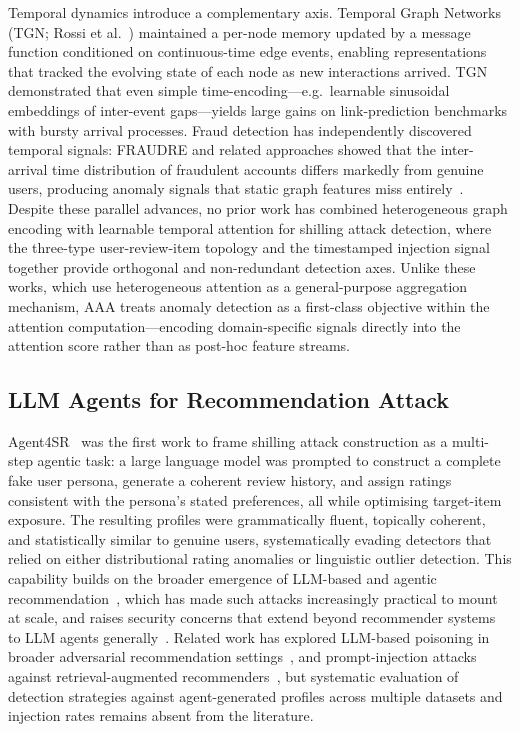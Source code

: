 Temporal dynamics introduce a complementary axis.
Temporal Graph Networks (TGN; Rossi et al.~\cite{rossi2020temporal}) maintained
a per-node memory updated by a message function conditioned on
continuous-time edge events, enabling representations that tracked the
evolving state of each node as new interactions arrived.
TGN demonstrated that even simple time-encoding—e.g.\ learnable sinusoidal
embeddings of inter-event gaps—yields large gains on link-prediction benchmarks
with bursty arrival processes.
Fraud detection has independently discovered temporal signals: FRAUDRE and
related approaches showed that the inter-arrival time distribution of fraudulent
accounts differs markedly from genuine users, producing anomaly signals that
static graph features miss entirely~\cite{liu2025fraud}.
Despite these parallel advances, no prior work has combined heterogeneous graph
encoding with learnable temporal attention for shilling attack detection, where
the three-type user-review-item topology and the timestamped injection signal
together provide orthogonal and non-redundant detection axes.
Unlike these works, which use heterogeneous attention as a general-purpose
aggregation mechanism, AAA treats anomaly detection as a first-class objective
within the attention computation—encoding domain-specific signals directly
into the attention score rather than as post-hoc feature streams.

\subsection{LLM Agents for Recommendation Attack}
\label{sec:rel_llm_attack}

Agent4SR~\cite{zhang2024agent4sr} was the first work to frame shilling attack
construction as a multi-step agentic task: a large language model was prompted
to construct a complete fake user persona, generate a coherent review history,
and assign ratings consistent with the persona's stated preferences, all while
optimising target-item exposure.
The resulting profiles were grammatically fluent, topically coherent, and
statistically similar to genuine users, systematically evading detectors
that relied on either distributional rating anomalies or linguistic
outlier detection.
This capability builds on the broader emergence of LLM-based and agentic
recommendation~\cite{lin2023survey,wang2023survey,plaat2025agentic}, which has
made such attacks increasingly practical to mount at scale, and raises
security concerns that extend beyond recommender systems to LLM agents
generally~\cite{he2024security}.
Related work has explored LLM-based poisoning in broader adversarial
recommendation settings~\cite{deldjoo2024survey}, and prompt-injection attacks
against retrieval-augmented recommenders~\cite{shi2023large}, but systematic
evaluation of detection strategies against agent-generated profiles across
multiple datasets and injection rates remains absent from the literature.

